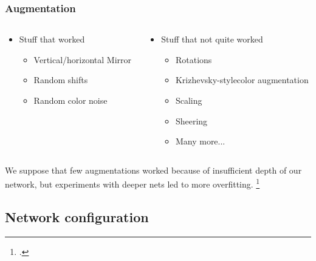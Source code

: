 \begin{frame}\frametitle{Augmentation}
\begin{columns}[T]
\begin{column}{5cm}
\begin{itemize}
\item Stuff that worked
\begin{itemize}
\item Vertical/horizontal Mirror 
\item Random shifts
\item Random color noise
\end{itemize}
\end{itemize}

\end{column}
\begin{column}{5cm}
\begin{itemize}
\item Stuff that not quite worked
\begin{itemize}
\item Rotations
\item Krizhevsky-style\footnotemark color augmentation
\item Scaling
\item Sheering
\item Many more...
\end{itemize}
\end{itemize}
\end{column}
\end{columns}
\vspace{0.25cm}
\par We suppose that few augmentations worked because of insufficient depth of our network, but experiments with deeper nets led to more overfitting.
\footcitetext{KRIZ}
\end{frame}

\subsection{Network configuration}

